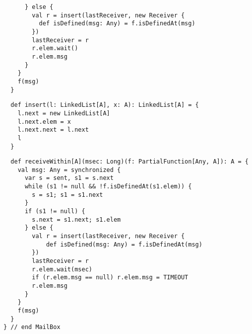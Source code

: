 \begin{itemize}
\begin{lstlisting}
      } else {
        val r = insert(lastReceiver, new Receiver {
          def isDefined(msg: Any) = f.isDefinedAt(msg)
        })
        lastReceiver = r
        r.elem.wait()
        r.elem.msg
      }
    }
    f(msg)
  }
\end{lstlisting}
\begin{lstlisting}
  def insert(l: LinkedList[A], x: A): LinkedList[A] = {
    l.next = new LinkedList[A]
    l.next.elem = x
    l.next.next = l.next
    l
  }
\end{lstlisting}
\begin{lstlisting}
  def receiveWithin[A](msec: Long)(f: PartialFunction[Any, A]): A = {
    val msg: Any = synchronized {
      var s = sent, s1 = s.next
      while (s1 != null && !f.isDefinedAt(s1.elem)) {
        s = s1; s1 = s1.next 
      }
      if (s1 != null) {
        s.next = s1.next; s1.elem
      } else {
        val r = insert(lastReceiver, new Receiver {
            def isDefined(msg: Any) = f.isDefinedAt(msg)
        })
        lastReceiver = r
        r.elem.wait(msec)
        if (r.elem.msg == null) r.elem.msg = TIMEOUT
        r.elem.msg
      }
    }
    f(msg)
  }
} // end MailBox
\end{lstlisting}



\end{itemize}
